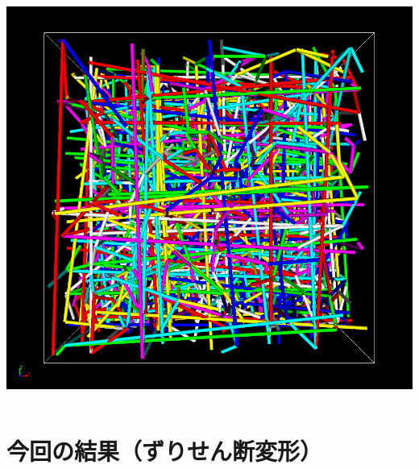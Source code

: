 \documentclass[12pt, dvipdfmx]{beamer}
\begin{document}
\begin{frame}
\begin{columns}[onlytextwidth]
				\includegraphics[width=.75\textwidth]{z_cord_4Chain.png}

				
	\end{columns}
\end{frame}





































\section{今回の結果（ずりせん断変形）}
\end{document}
